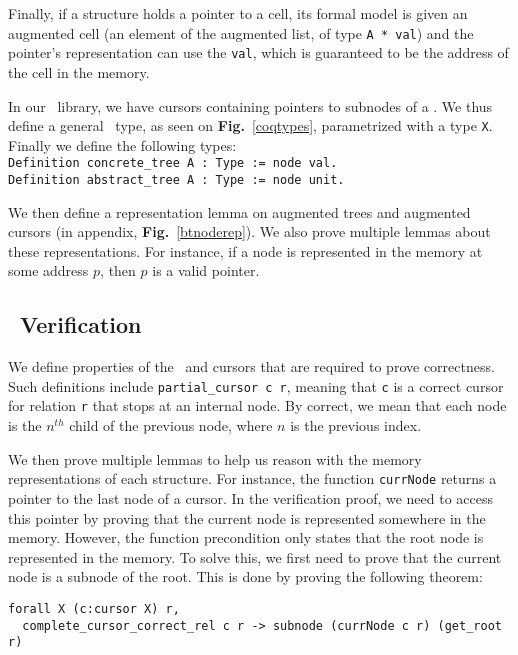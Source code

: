Finally, if a structure holds a pointer to a cell, its formal model is given an augmented cell (an element of the augmented list, of type \lstinline{A * val}) and the pointer's representation can use the \lstinline{val}, which is guaranteed to be the address of the cell in the memory.

In our \btrees\ library, we have cursors containing pointers to subnodes of a \btree. We thus define a general \btree\ type, as seen on \textbf{Fig.}~\ref{coqtypes}, parametrized with a type \texttt{X}.
Finally we define the following types:\\
\lstinline[language=Coq]{Definition concrete_tree A : Type := node val.}\\
\lstinline[language=Coq]{Definition abstract_tree A : Type := node unit.}

We then define a representation lemma on augmented trees and augmented cursors (in appendix, \textbf{Fig.}~\ref{btnoderep}).
We also prove multiple lemmas about these representations. For instance, if a node is represented in the memory at some address $p$, then $p$ is a valid pointer.

\subsection{\btrees\ Verification}
\label{subsec:btverif}
We define properties of the \btrees\ and cursors that are required to prove correctness.
Such definitions include \texttt{partial\_cursor c r}, meaning that \texttt{c} is a correct cursor for relation \texttt{r} that stops at an internal node.
By correct, we mean that each node is the $n^{th}$ child of the previous node, where $n$ is the previous index.

We then prove multiple lemmas to help us reason with the memory representations of each structure.
For instance, the function \texttt{currNode} returns a pointer to the last node of a cursor.
In the verification proof, we need to access this pointer by proving that the current node is represented somewhere in the memory.
However, the function precondition only states that the root node is represented in the memory.
To solve this, we first need to prove that the current node is a subnode of the root.
This is done by proving the following theorem:
\begin{lstlisting}[language=Coq]
  forall X (c:cursor X) r,
  complete_cursor_correct_rel c r -> subnode (currNode c r) (get_root r)
\end{lstlisting}

